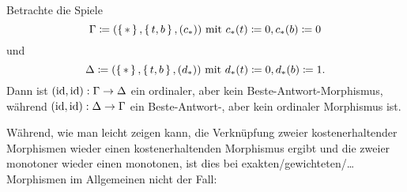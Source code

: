 \begin{bsp}
	Betrachte die Spiele 
		\[\Gamma \coloneqq (\set{\ast}, \set{t, b}, (c_\ast)) \text{ mit } c_\ast(t) \coloneqq 0, c_\ast(b) \coloneqq 0\]
	und 
		\[\Delta \coloneqq (\set{\ast}, \set{t, b}, (d_\ast)) \text{ mit } d_\ast(t) \coloneqq 0, d_\ast(b) \coloneqq 1.\]
	Dann ist $(\mathrm{id}, \mathrm{id}): \Gamma \to \Delta$ ein ordinaler, aber kein Beste-Antwort-Morphismus, während $(\mathrm{id}, \mathrm{id}): \Delta \to \Gamma$  ein Beste-Antwort-, aber kein ordinaler Morphismus ist.
\end{bsp}

Während, wie man leicht zeigen kann, die Verknüpfung zweier kostenerhaltender Morphismen wieder einen kostenerhaltenden Morphismus ergibt und die zweier monotoner wieder einen monotonen, ist dies bei exakten/gewichteten/\dots{} Morphismen im Allgemeinen nicht der Fall: 

